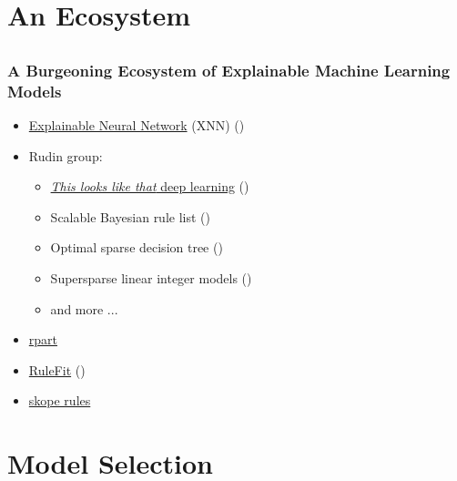 \documentclass[11pt,aspectratio=169,hyperref={colorlinks}]{beamer}
\begin{document}
	\section{An Ecosystem}
			
		\subsection*{}
		
		\begin{frame}
		
			\frametitle{A Burgeoning Ecosystem of Explainable Machine Learning Models}		
			
			\begin{itemize}
				\item \href{https://www.mdpi.com/2078-2489/11/3/137}{Explainable Neural Network} (XNN) (\cite{wf_xnn})
				\item Rudin group: 
				\begin{itemize}
					\item \href{https://www.youtube.com/watch?v=k3IQnRsl9U4}{\textit{This looks like that} deep learning} (\cite{this_looks_like_that})
					\item Scalable Bayesian rule list (\cite{sbrl}) 
					\item Optimal sparse decision tree (\cite{osdt})
					\item Supersparse linear integer models (\cite{slim})
					\item and more ... 
				\end{itemize}
				\item \href{https://github.com/scikit-learn-contrib/skope-rules}{rpart}
				\item \href{https://christophm.github.io/interpretable-ml-book/rulefit.html}{RuleFit} (\cite{rulefit})
				\item \href{https://github.com/scikit-learn-contrib/skope-rules}{skope rules}
			\end{itemize}
		
		\end{frame}

	\section{Model Selection}
\end{document}
